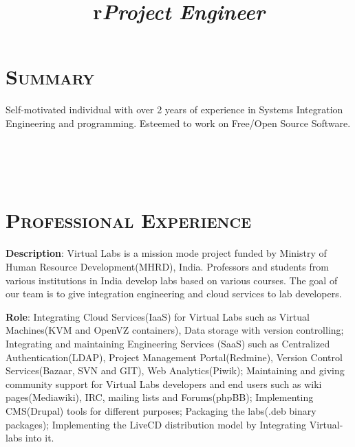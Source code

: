 \begin{resume}




\section{\textsc{Summary}}
Self-motivated individual with over 2 years of experience in Systems
Integration Engineering and programming. Esteemed to work on Free/Open
Source Software.
 

\begin{formatb}
  \title{r}\\
  \\
  \body\\
\end{formatb}

\section{\textsc{Professional Experience}}
\title{\em \textbf{Project Engineer}}
\begin{position}
\textbf{Description}: Virtual Labs is a mission mode project funded by
Ministry of Human Resource Development(MHRD), India. Professors and
students from various institutions in India develop labs based on
various courses. The goal of our team is to give integration
engineering and cloud services to lab developers.

\textbf{Role}: Integrating Cloud Services(IaaS) for Virtual Labs such
as Virtual Machines(KVM and OpenVZ containers), Data storage with
version controlling; Integrating and maintaining Engineering Services
(SaaS) such as Centralized Authentication(LDAP), Project Management
Portal(Redmine), Version Control Services(Bazaar, SVN and GIT), Web
Analytics(Piwik); Maintaining and giving community support for Virtual
Labs developers and end users such as wiki pages(Mediawiki), IRC,
mailing lists and Forums(phpBB); Implementing CMS(Drupal) tools for
different purposes; Packaging the labs(.deb binary packages);
Implementing the LiveCD distribution model by Integrating Virtual-labs
into it.


\end{position}
\end{resume}
